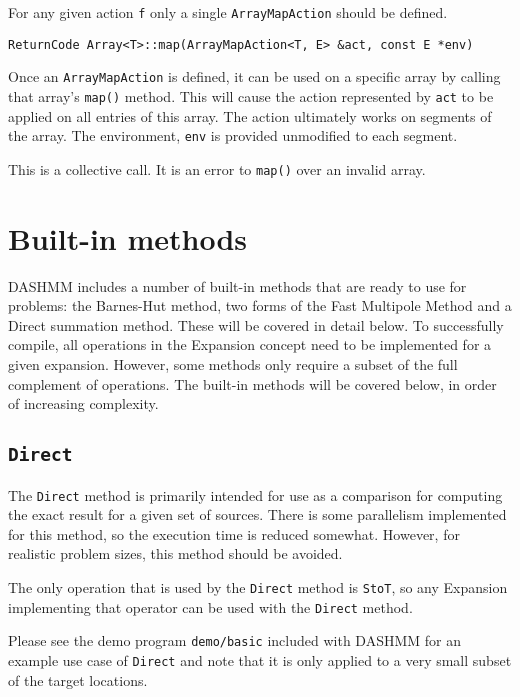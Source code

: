For any given action \texttt{f} only a single \texttt{ArrayMapAction}
should be defined.

\begin{lstlisting}
ReturnCode Array<T>::map(ArrayMapAction<T, E> &act, const E *env)
\end{lstlisting}

\noindent Once an \texttt{ArrayMapAction} is defined, it can be used on a
specific array
by calling that array's \texttt{map()} method. This will cause the action
represented by \texttt{act} to be applied on all entries of this array. The
action ultimately works on segments of the array. The environment, \texttt{env}
is provided unmodified to each segment.

This is a collective call. It is an error to \texttt{map()} over an invalid array.


\section{Built-in methods}
\label{sec:bi-met}

DASHMM includes a number of built-in methods that are ready to use for
problems: the Barnes-Hut method, two forms of the Fast Multipole Method and
a Direct summation method. These will be covered in detail below. To
successfully compile, all operations in the Expansion concept need to be
implemented for a given expansion. However, some methods only require a
subset of the full complement of operations. The built-in methods will be
covered below, in order of increasing complexity.

\subsection{\texttt{Direct}}

The \texttt{Direct} method is primarily intended for use as a comparison for
computing
the exact result for a given set of sources. There is some parallelism
implemented for this method, so the execution time is reduced somewhat.
However, for realistic problem sizes, this method should be avoided.

The only operation that is used by the \texttt{Direct} method is
\texttt{StoT}, so any Expansion implementing that operator can be used with the
\texttt{Direct} method.

Please see the demo program \texttt{demo/basic} included with DASHMM for an
example use case of \texttt{Direct} and note that it is only applied to a very
small subset of the target locations.

